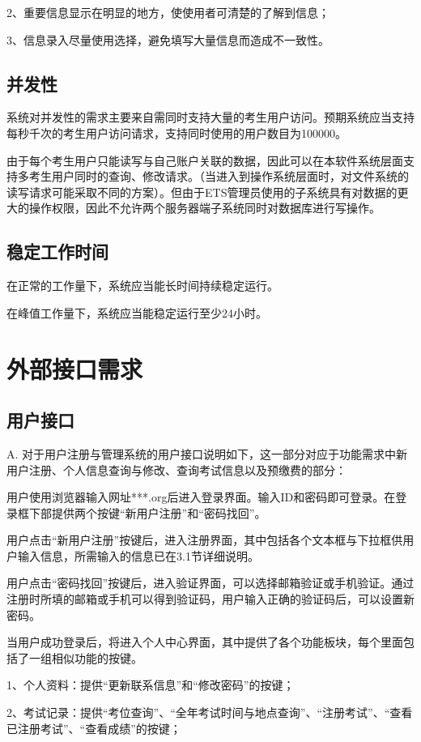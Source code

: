 2、重要信息显示在明显的地方，使使用者可清楚的了解到信息；

3、信息录入尽量使用选择，避免填写大量信息而造成不一致性。

\subsection{并发性}
系统对并发性的需求主要来自需同时支持大量的考生用户访问。预期系统应当支持每秒千次的考生用户访问请求，支持同时使用的用户数目为100000。

由于每个考生用户只能读写与自己账户关联的数据，因此可以在本软件系统层面支持多考生用户同时的查询、修改请求。（当进入到操作系统层面时，对文件系统的读写请求可能采取不同的方案）。但由于ETS管理员使用的子系统具有对数据的更大的操作权限，因此不允许两个服务器端子系统同时对数据库进行写操作。

\subsection{稳定工作时间}
在正常的工作量下，系统应当能长时间持续稳定运行。

在峰值工作量下，系统应当能稳定运行至少24小时。

\section{外部接口需求}

\subsection{用户接口}
A. 对于用户注册与管理系统的用户接口说明如下，这一部分对应于功能需求中新用户注册、个人信息查询与修改、查询考试信息以及预缴费的部分：

用户使用浏览器输入网址***.org后进入登录界面。输入ID和密码即可登录。在登录框下部提供两个按键“新用户注册”和“密码找回”。

用户点击“新用户注册”按键后，进入注册界面，其中包括各个文本框与下拉框供用户输入信息，所需输入的信息已在3.1节详细说明。

用户点击“密码找回”按键后，进入验证界面，可以选择邮箱验证或手机验证。通过注册时所填的邮箱或手机可以得到验证码，用户输入正确的验证码后，可以设置新密码。

当用户成功登录后，将进入个人中心界面，其中提供了各个功能板块，每个里面包括了一组相似功能的按键。

1、个人资料：提供“更新联系信息”和“修改密码”的按键；
	
2、考试记录：提供“考位查询”、“全年考试时间与地点查询”、“注册考试”、“查看已注册考试”、“查看成绩”的按键；

